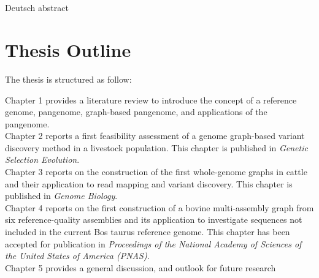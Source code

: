 \documentclass[11 pt, a4paper, notitlepage, twoside]{report}
\begin{document}
\newpage

\thispagestyle{plain}
\section*{}

Deutsch abstract

\newpage

\section*{\LARGE{Thesis Outline}}
\thispagestyle{plain}

The thesis is structured as follow:

Chapter 1 provides a literature review to introduce the concept of a reference genome, pangenome, graph-based pangenome, and applications of the pangenome. \\


Chapter 2 reports a first feasibility assessment of a genome graph-based variant discovery method in a livestock population. This chapter is published in \emph{Genetic Selection Evolution}. \\ 


Chapter 3 reports on the construction of the first  whole-genome graphs in cattle and their application to read mapping and variant discovery. This chapter is published in \emph{Genome Biology}. \\


Chapter 4 reports on the first construction of a bovine multi-assembly graph from six reference-quality assemblies and its application to investigate sequences not included in the current Bos taurus reference genome. This chapter has been accepted for publication in \emph{Proceedings of the National Academy of Sciences of the United States of America (PNAS)}. \\


Chapter 5 provides a general discussion, and outlook for future research


\iftwoside
\cleardoublepage
\newpage
\fi

\newpage







\onehalfspacing


\end{document}
